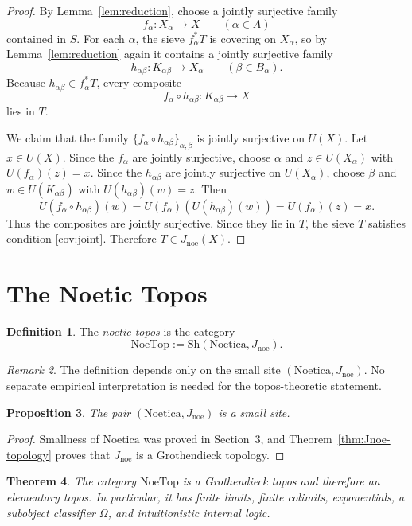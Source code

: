 \documentclass[11pt]{amsart}
\numberwithin{equation}{section}
\newtheorem{theorem}{Theorem}[section]
\newtheorem{proposition}[theorem]{Proposition}
\theoremstyle{definition}
\newtheorem{definition}[theorem]{Definition}
\theoremstyle{remark}
\newtheorem{remark}[theorem]{Remark}
\newcommand{\Noetica}{\mathrm{Noetica}}
\newcommand{\NoeTop}{\mathrm{NoeTop}}
\newcommand{\Sh}{\mathrm{Sh}}
\newcommand{\Jnoe}{J_{\mathrm{noe}}}
\begin{document}
\begin{proof}
By Lemma~\ref{lem:reduction}, choose a jointly surjective family
\[
f_{\alpha} : X_{\alpha} \to X \qquad (\alpha \in A)
\]
contained in \(S\). For each \(\alpha\), the sieve \(f_{\alpha}^{*}T\) is covering on \(X_{\alpha}\), so by Lemma~\ref{lem:reduction} again it contains a jointly surjective family
\[
h_{\alpha\beta} : K_{\alpha\beta} \to X_{\alpha}
\qquad
(\beta \in B_{\alpha}).
\]
Because \(h_{\alpha\beta} \in f_{\alpha}^{*}T\), every composite
\[
f_{\alpha}\circ h_{\alpha\beta} : K_{\alpha\beta} \to X
\]
lies in \(T\).

We claim that the family \(\{f_{\alpha}\circ h_{\alpha\beta}\}_{\alpha,\beta}\) is jointly surjective on \(U(X)\). Let \(x \in U(X)\). Since the \(f_{\alpha}\) are jointly surjective, choose \(\alpha\) and \(z \in U(X_{\alpha})\) with \(U(f_{\alpha})(z)=x\). Since the \(h_{\alpha\beta}\) are jointly surjective on \(U(X_{\alpha})\), choose \(\beta\) and \(w \in U(K_{\alpha\beta})\) with \(U(h_{\alpha\beta})(w)=z\). Then
\[
U(f_{\alpha}\circ h_{\alpha\beta})(w)
= U(f_{\alpha})(U(h_{\alpha\beta})(w))
= U(f_{\alpha})(z)
= x.
\]
Thus the composites are jointly surjective. Since they lie in \(T\), the sieve \(T\) satisfies condition \ref{cov:joint}. Therefore \(T \in \Jnoe(X)\).
\end{proof}

\section{The Noetic Topos}

\begin{definition}
The \emph{noetic topos} is the category
\[
\NoeTop := \Sh(\Noetica,\Jnoe).
\]
\end{definition}

\begin{remark}
The definition depends only on the small site \((\Noetica,\Jnoe)\). No separate empirical interpretation is needed for the topos-theoretic statement.
\end{remark}

\begin{proposition}
The pair \((\Noetica,\Jnoe)\) is a small site.
\end{proposition}

\begin{proof}
Smallness of \(\Noetica\) was proved in Section~3, and Theorem~\ref{thm:Jnoe-topology} proves that \(\Jnoe\) is a Grothendieck topology.
\end{proof}

\begin{theorem}\label{thm:noetic-topos}
The category \(\NoeTop\) is a Grothendieck topos and therefore an elementary topos. In particular, it has finite limits, finite colimits, exponentials, a subobject classifier \(\Omega\), and intuitionistic internal logic.
\end{theorem}
\end{document}
